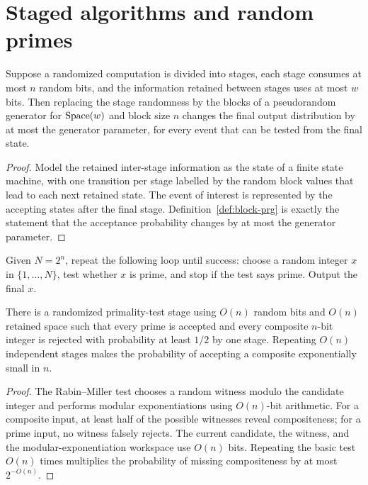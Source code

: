 \chapter{Staged algorithms and random primes}

\begin{proposition}
  \label{prop:staged-algorithm-principle}
  Suppose a randomized computation is divided into stages, each stage consumes
  at most $n$ random bits, and the information retained between stages uses at
  most $w$ bits. Then replacing the stage randomness by the blocks of a
  pseudorandom generator for $\operatorname{Space}(w)$ and block size $n$ changes the final
  output distribution by at most the generator parameter, for every event that
  can be tested from the final state.
\end{proposition}
\begin{proof}
  Model the retained inter-stage information as the state of a finite state
  machine, with one transition per stage labelled by the random block values
  that lead to each next retained state. The event of interest is represented
  by the accepting states after the final stage. Definition~\ref{def:block-prg}
  is exactly the statement that the acceptance probability changes by at most
  the generator parameter.
\end{proof}

\begin{algorithm}
  \label{alg:uniform-prime-generation}
  Given $N=2^n$, repeat the following loop until success: choose a random
  integer $x$ in $\{1,\ldots,N\}$, test whether $x$ is prime, and stop if the
  test says prime. Output the final $x$.
\end{algorithm}

\begin{lemma}
  \label{lem:rabin-miller-basic-test}
  There is a randomized primality-test stage using $O(n)$ random bits and
  $O(n)$ retained space such that every prime is accepted and every composite
  $n$-bit integer is rejected with probability at least $1/2$ by one stage.
  Repeating $O(n)$ independent stages makes the probability of accepting a
  composite exponentially small in $n$.
\end{lemma}
\begin{proof}
  The Rabin--Miller test chooses a random witness modulo the candidate integer
  and performs modular exponentiations using $O(n)$-bit arithmetic. For a
  composite input, at least half of the possible witnesses reveal compositeness;
  for a prime input, no witness falsely rejects. The current candidate, the
  witness, and the modular-exponentiation workspace use $O(n)$ bits. Repeating
  the basic test $O(n)$ times multiplies the probability of missing
  compositeness by at most $2^{-O(n)}$.
\end{proof}


